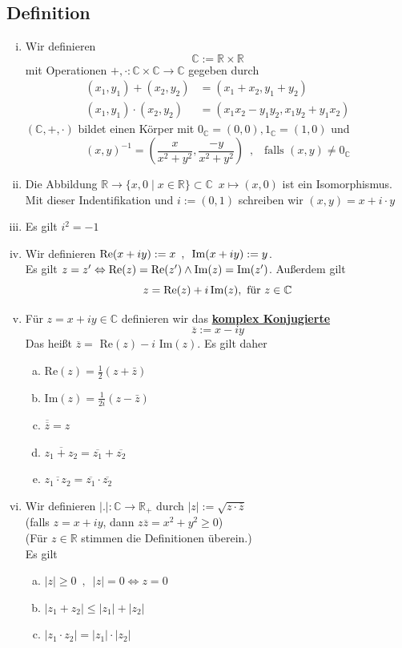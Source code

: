 \subsection{Definition} %
\label{sub:definition}
\begin{enumerate}[(i)]
	\item Wir definieren 
	\[
		\mathds{C} := \mathds{R} \times \mathds{R}
	\]
	mit Operationen $+, \cdot : \mathds{C} \times \mathds{C} \to \mathds{C} $ gegeben durch
	\begin{align*}
		(x_1, y_1) + (x_2, y_2) &= (x_1 + x_2 , y_1 + y_2) \\
		(x_1, y_1) \cdot (x_2, y_2) &= (x_1 x_2 - y_1 y_2 , x_1 y_2 + y_1 x_2 ) 
	\end{align*}
	$(\mathds{C}, +, \cdot )$ bildet einen Körper mit $0_{\mathds{C}}= (0,0), 1_{\mathds{C}}=(1,0)$ und 
	\[
		(x,y)^{-1} = \left(\frac{x}{x^2 + y^2} , \frac{-y}{x^2 + y^2}\right) \enspace , \enspace \text{ falls } (x,y) \not= 0_{\mathds{C}}
	\]
	\item Die Abbildung $\mathds{R} \to \{ x, 0 \mid x \in \mathds{R} \} \subset \mathds{C}  \enspace x \mapsto (x,0) $ ist ein Isomorphismus.
	Mit dieser Indentifikation und $i := (0,1)$  schreiben wir $(x,y)= x + i \cdot y$
	\item Es gilt $\boxed{i^2= -1}$
	\item Wir definieren $ \operatorname{Re}(x+iy) := x \enspace , \enspace \operatorname{Im}(x+iy):= y$.  \\ Es gilt $z=z' \Leftrightarrow \operatorname{Re}(z)= \operatorname{Re}(z')
	\wedge \operatorname{Im}(z)= \operatorname{Im}(z')$. Außerdem gilt
	\[
		z= \operatorname{Re}(z)+ i \operatorname{Im} (z), \text{ für } z \in \mathbb{C}
	\]
	\item Für $z=x+iy \in \mathds{C}$ definieren wir das \underline{ \textbf{komplex Konjugierte}}
	\[
		\overline{z} := x-iy 
	\]
	Das heißt $\overline{z} = \text{ Re}(z)- i \text{ Im}(z)$. Es gilt daher
	\begin{enumerate}[a)]
		\item $\text{Re}(z)= \frac{1}{2}(z+ \bar z)$
		\item $\text{Im}(z)=\frac{1}{2i} (z-\bar z)$
		\item $\overline{\overline{z}} = z$
		\item $\overline{z_1 +z_2} = \overline{z_1}+ \overline{z_2}$
		\item $\overline{z_1 \cdot z_2} = \overline{z_1} \cdot \overline{z_2}$
	\end{enumerate}
	\item Wir definieren $|.| : \mathds{C} \to \mathds{R}_+$ durch $|z| := \sqrt{z \cdot \overline{z}}$ \\
	(falls $z=x+iy$, dann $z \overline{z}= x^2 + y^2 \ge 0$) \\
	{\small (Für $z \in \mathds{R}$ stimmen die Definitionen überein.)} \\
	Es gilt
	\begin{enumerate}[a)]
		\item $|z| \ge 0 \enspace , \enspace |z|=0 \Leftrightarrow z=0$
		\item $|z_1+ z_2| \le |z_1| + |z_2|$
		\item $|z_1 \cdot z_2|= |z_1| \cdot |z_2|$
	\end{enumerate}
\end{enumerate}
